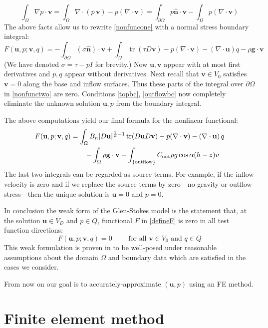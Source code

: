\documentclass[letterpaper,final,12pt,reqno]{amsart}
\newcommand{\trace}{\operatorname{tr}}
\newcommand{\hbn}{\hat{\mathbf{n}}}
\newcommand{\bu}{\mathbf{u}}
\newcommand{\bv}{\mathbf{v}}
\begin{document}
    $$\int_\Omega \nabla p \cdot \bv = \int_\Omega \nabla\cdot (p\,\bv) - p (\nabla \cdot \bv) = \int_{\partial \Omega} p\hbn \cdot \bv - \int_\Omega p (\nabla \cdot \bv)$$
The above facts allow us to rewrite \eqref{nonfuncone} with a normal stress boundary integral:
\begin{equation}
F(\bu,p;\bv,q) = -\int_{\partial\Omega} (\sigma \hbn)\cdot \bv + \int_\Omega \trace(\tau D\bv) - p (\nabla \cdot \bv) - \left(\nabla \cdot \bu\right) q - \rho \mathbf{g} \cdot \bv \label{nonfunctwo}
\end{equation}
(We have denoted $\sigma=\tau-pI$ for brevity.)  Now $\bu,\bv$ appear with at most first derivatives and $p,q$ appear without derivatives.  Next recall that $\bv\in V_0$ satisfies $\bv=0$ along the base and inflow surfaces.  Thus these parts of the integral over $\partial\Omega$ in \eqref{nonfunctwo} are zero.  Conditions \eqref{topbc}, \eqref{outflowbc} now completely eliminate the unknown solution $\bu,p$ from the boundary integral.

The above computations yield our final formula for the nonlinear functional:
\begin{align}
F(\bu,p;\bv,q) &= \int_\Omega B_n |D\bu|^{\frac{1}{n} - 1} \trace(D\bu D\bv) - p (\nabla \cdot \bv) - \left(\nabla \cdot \bu\right) q \label{defineF} \\
    &\qquad  - \int_\Omega \rho \mathbf{g} \cdot \bv - \int_{\{\text{outflow}\}} C_{\text{out}} \rho g \cos\alpha (h-z) v  \notag
\end{align}
The last two integrals can be regarded as source terms.  For example, if the inflow velocity is zero and if we replace the source terms by zero---no gravity or outflow stress---then the unique solution is $\bu=0$ and $p=0$.

In conclusion the weak form of the Glen-Stokes model is the statement that, at the solution $\bu\in V_D$ and $p\in Q$, functional $F$ in \eqref{defineF} is zero in all test function directions:
\begin{equation}
F(\bu,p;\bv,q) = 0 \qquad \text{ for all } \bv\in V_0 \text{ and } q\in Q  \label{weak}
\end{equation}
This weak formulation is proven in \cite[Theorem 3.8]{JouvetRappaz2011} to be well-posed under reasonable assumptions about the domain $\Omega$ and boundary data which are satisfied in the cases we consider.

From now on our goal is to accurately-approximate $(\bu,p)$ using an FE method.


\section{Finite element method} \label{sec:femethod}
\end{document}
